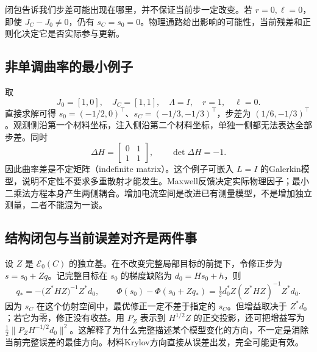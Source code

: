闭包告诉我们步差可能出现在哪里，并不保证当前步一定改变。若 $r=0,\ell=0$，即使 $J_C-J_0\ne0$，仍有 $s_C=s_0=0$。物理通路给出影响的可能性，当前残差和正则化决定它是否实际参与更新。

\subsection{非单调曲率的最小例子}
取
\begin{equation}
 J_0=[1,0],\quad J_C=[1,1],\quad\Lambda=I,\quad r=1,\quad\ell=0.
\end{equation}
直接求解可得 $s_0=(-1/2,0)^\top$、$s_C=(-1/3,-1/3)^\top$，步差为 $(1/6,-1/3)^\top$。观测侧沿第一个材料坐标，注入侧沿第二个材料坐标，单独一侧都无法表达全部步差。同时
\begin{equation}
 \Delta H=\begin{bmatrix}0&1\\1&1\end{bmatrix},\qquad\det\Delta H=-1.
\end{equation}
因此曲率差是不定矩阵（indefinite matrix）。这个例子可嵌入 $L=I$ 的Galerkin模型，说明不定性不要求多重散射才能发生。Maxwell反馈决定实际物理因子；最小二乘法方程本身产生两侧耦合。增加电流空间是改进已有测量模型，不是增加独立测量，二者不能混为一谈。

\subsection{结构闭包与当前误差对齐是两件事}
设 $Z$ 是 $\mathcal E_0(C)$ 的独立基。在不改变完整局部目标的前提下，令修正步为 $s=s_0+Zq$。记完整目标在 $s_0$ 的梯度缺陷为 $d_0=Hs_0+h$，则
\begin{equation}
 q_*=-\bigl(Z^*HZ\bigr)^{-1}Z^*d_0,
 \qquad
 \Phi(s_0)-\Phi(s_0+Zq_*)
 =\tfrac12 d_0^*Z(Z^*HZ)^{-1}Z^*d_0.
\end{equation}
因为 $s_C$ 在这个仿射空间中，最优修正一定不差于指定的 $s_C$。但增益取决于 $Z^*d_0$；若它为零，修正没有收益。用 $P_Z$ 表示到 $H^{1/2}Z$ 的正交投影，还可把增益写为 $\tfrac12\|P_ZH^{-1/2}d_0\|^2$。这解释了为什么完整描述某个模型变化的方向，不一定是消除当前完整误差的最佳方向。材料Krylov方向直接从误差出发，完全可能更有效。
